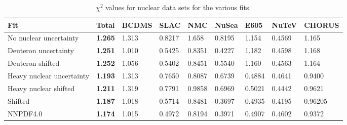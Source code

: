 \begin{table}[h]
  \centering
  \scriptsize
  \renewcommand{\arraystretch}{1.13}
  \begin{tabularx}{\textwidth}{lllllllll}
    \toprule
    {\bf Fit }  & {\bf Total }   & BCDMS & SLAC & NMC & NuSea & E605 & NuTeV & CHORUS  \\
    \midrule
    No nuclear uncertainty & {\bf 1.265 } & 1.313 & 0.8217 & 1.658 & 0.8195 & 1.154 &  0.4569 & 1.165 \\
    \midrule
    Deuteron uncertainty & {\bf  1.251 } & 1.010 & 0.5425 & 0.8351 & 0.4227 & 1.182 & 0.4598 & 1.168 \\
    Deuteron shifted & {\bf 1.252 } & 1.056 & 0.5402 & 0.8451 & 0.5540 & 1.160 & 0.4563 & 1.164 \\
    \midrule
    Heavy nuclear uncertainty & {\bf 1.193} & 1.313 & 0.7650 & 0.8087 & 0.6739 & 0.4884 &  0.4641 & 0.9400 \\
    Heavy nuclear shifted & {\bf 1.211} & 1.319 & 0.7791 & 0.9858 & 0.6969 & 0.5021 &  0.4442 & 0.9621 \\
    \midrule
    Shifted & {\bf 1.187} & 1.018 & 0.5714 & 0.8481 & 0.3697 & 0.4935 & 0.4195  & 0.96205\\
    NNPDF4.0  & {\bf  1.174 } & 1.015 & 0.4972 & 0.8194 & 0.3971 & 0.4907 & 0.4602 & 0.9372 \\
    \bottomrule
  \end{tabularx}
  \caption{$\chi^2$ values for nuclear data sets for the various fits. \label{tab:nucfitchi2} }
  
\end{table}
